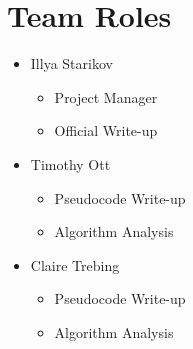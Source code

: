 \documentclass{article}
\begin{document}
\section{Team Roles}
\begin{itemize}
    \item Illya Starikov
    \begin{itemize}
        \item Project Manager
        \item Official Write-up
    \end{itemize}
    \item Timothy Ott
    \begin{itemize}
        \item Pseudocode Write-up
        \item Algorithm Analysis
    \end{itemize}
    \item Claire Trebing
    \begin{itemize}
        \item Pseudocode Write-up
        \item Algorithm Analysis
    \end{itemize}
\end{itemize}
\end{document}

